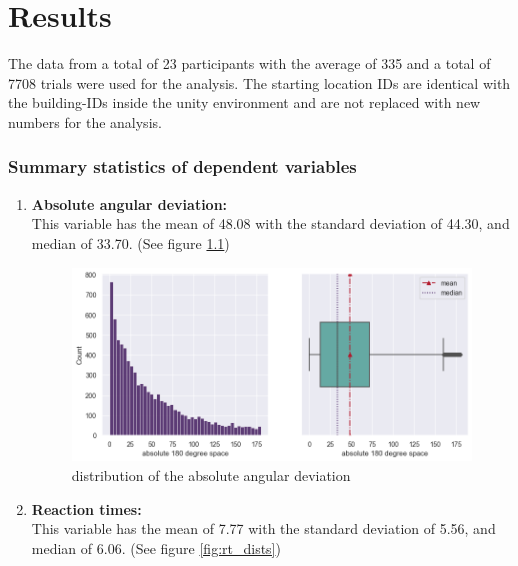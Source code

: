 \chapter{Results}

The data from a total of 23 participants with the average of 335 and a total of 7708 trials were used for the analysis. The starting location IDs are identical with the building-IDs inside the unity environment and are not replaced with new numbers for the analysis.

\subsection{Summary statistics of dependent variables}

\begin{enumerate}
	\item \textbf{Absolute angular deviation:} \\
	This variable has the mean of 48.08 with the standard deviation of 44.30, and median of 33.70. (See figure \ref{fig:angular_dev_dists})
	
	\begin{figure}[h]
		\centering
		\includegraphics[width=150mm]{figures/angular_deviation_hist_box_23.png}
		\caption[Distribution of the absolute angular deviation]{distribution of the absolute angular deviation}
		\label{fig:angular_dev_dists}
	\end{figure}

	\item \textbf{Reaction times:} \\
	This variable has the mean of 7.77 with the standard deviation of 5.56, and median of 6.06. (See figure \ref{fig:rt_dists})
	

\end{enumerate}

